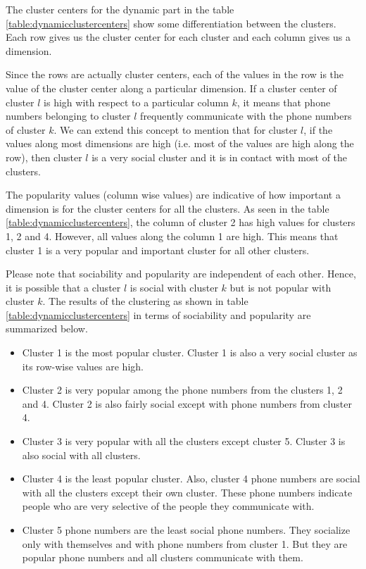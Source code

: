 \documentclass[oribibl]{llncs}
\begin{document}
The cluster centers for the dynamic part in the table \ref{table:dynamicclustercenters}
show some differentiation between the 
clusters. Each row gives us
the cluster center for each cluster and each column gives us a dimension.

Since the rows are actually cluster centers,
each of the values in the row is the value of the cluster center along
a particular dimension.
If a cluster center of cluster $l$ is high with respect to a particular 
column $k$, it means that phone numbers belonging 
to cluster $l$ frequently communicate with the phone numbers of cluster $k$. We can
extend this concept to mention that for cluster $l$, if the values
along  most dimensions are high (i.e. most of the 
values are high along the row), then cluster $l$ is a very social 
cluster and it is in contact with most of the clusters. 

The popularity  values (column wise values) are indicative of how 
important a dimension is for the cluster centers for 
all the clusters. As seen in the table \ref{table:dynamicclustercenters},
 the column of cluster 2 has high values for 
clusters 1, 2 and 4.
However, all values along the column 1 are high. This means that cluster 1 is a very popular and important cluster for 
all other clusters.

Please note that sociability and popularity are independent of each 
other. Hence, it is possible that a cluster $l$ is social
with cluster $k$ but is not popular with cluster $k$.
The results of the clustering as shown in table 
\ref{table:dynamicclustercenters} in terms of sociability
and popularity are summarized below.

\begin{itemize}
\item
Cluster 1 is the most popular cluster. 
Cluster 1 is also a very social cluster as its row-wise values are high.
\item
Cluster 2 is very popular among the phone numbers from the clusters
1, 2 and 4. 
Cluster 2 is also fairly social except with phone numbers from cluster 4.
\item
Cluster 3 is very popular with all the clusters except cluster 5. 
Cluster 3 is also social with all clusters.
\item
Cluster 4 is the least popular cluster. Also, cluster 4 phone numbers are social 
with all the clusters except their own cluster. These phone numbers
indicate people who are very selective of the people they communicate
with.
\item
Cluster 5 phone numbers are the least social phone numbers. They 
socialize only with themselves and with phone numbers from cluster 1. 
But they are popular phone numbers and all clusters communicate with 
them.
\end{itemize}
\end{document}
